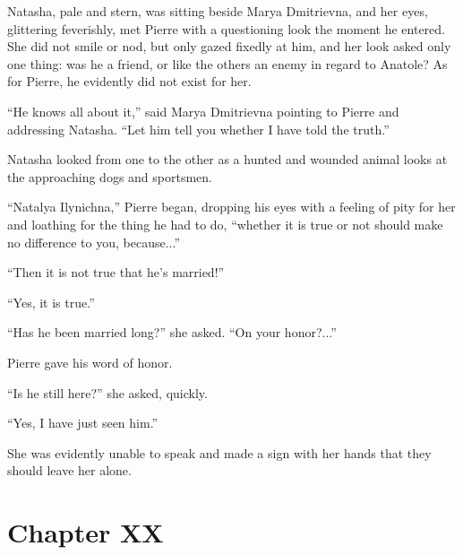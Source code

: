 Natasha, pale and stern, was sitting beside Marya Dmitrievna, and
her eyes, glittering feverishly, met Pierre with a questioning
look the moment he entered. She did not smile or nod, but only
gazed fixedly at him, and her look asked only one thing: was he a
friend, or like the others an enemy in regard to Anatole? As for
Pierre, he evidently did not exist for her.

``He knows all about it,'' said Marya Dmitrievna pointing to
Pierre and addressing Natasha. ``Let him tell you whether I have
told the truth.''

Natasha looked from one to the other as a hunted and wounded
animal looks at the approaching dogs and sportsmen.

``Natalya Ilynichna,'' Pierre began, dropping his eyes with a
feeling of pity for her and loathing for the thing he had to do,
``whether it is true or not should make no difference to you,
because...''

``Then it is not true that he's married!''

``Yes, it is true.''

``Has he been married long?'' she asked. ``On your honor?...''

Pierre gave his word of honor.

``Is he still here?'' she asked, quickly.

``Yes, I have just seen him.''

She was evidently unable to speak and made a sign with her hands
that they should leave her alone.


\chapter*{Chapter XX}
\ifaudio     
{} 
\fi

